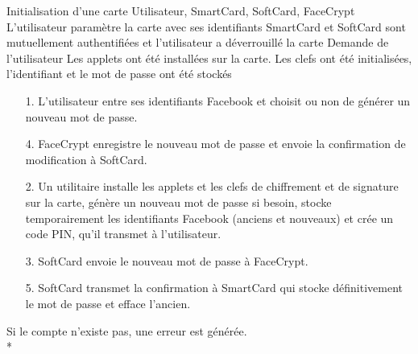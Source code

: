 \documentclass[a4paper,11pt,french]{article}
\begin{document}
\fiche
{Initialisation d'une carte}
	{Utilisateur, SmartCard, SoftCard, FaceCrypt}
    {L'utilisateur paramètre la carte avec ses identifiants}
    {SmartCard et SoftCard sont mutuellement authentifiées et l'utilisateur a
    déverrouillé la carte}
    {Demande de l'utilisateur}
    {Les applets ont été installées sur la carte. Les clefs ont été 
        initialisées, l'identifiant et le mot de passe ont été stockés}
    {\begin{itemize}
        \item[]
        \item[1.] L'utilisateur entre ses identifiants Facebook et choisit ou 
        non de générer un nouveau mot de passe. 
        \item[4.] FaceCrypt enregistre le nouveau mot de passe et envoie la
        confirmation de modification à SoftCard.
    \end{itemize}}
	{\begin{itemize}
        \item[]
        \item[2.] Un utilitaire installe les applets et les clefs de chiffrement
        et de signature sur la carte, génère un nouveau mot de passe si besoin,
        stocke temporairement les identifiants Facebook (anciens et nouveaux)
        et crée un code PIN, qu'il transmet à l'utilisateur.
        \item[3.] SoftCard envoie le nouveau mot de passe à FaceCrypt.
        \item[5.] SoftCard transmet la confirmation à SmartCard qui stocke
            définitivement le mot de passe et efface l'ancien.
	\end{itemize}
	}
	{}
\flots
    {}
    {Si le compte n'existe pas, une erreur est générée.}
\\*
\end{document}
